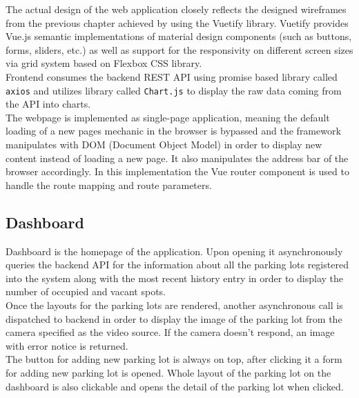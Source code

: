 \documentclass[thesis=M,english]{FITthesis}[2019/03/06]
\begin{document}
The actual design of the web application closely reflects the designed wireframes from the previous chapter achieved by using the Vuetify library. Vuetify provides Vue.js semantic implementations of material design components (such as buttons, forms, sliders, etc.) as well as support for the responsivity on different screen sizes via grid system based on Flexbox CSS library.\\

Frontend consumes the backend REST API using promise based library called \texttt{axios} and utilizes library called \texttt{Chart.js} to display the raw data coming from the API into charts.\\

The webpage is implemented as single-page application, meaning the default loading of a new pages mechanic in the browser is bypassed and the framework manipulates with DOM (Document Object Model) in order to display new content instead of loading a new page. It also manipulates the address bar of the browser accordingly. In this implementation the Vue router component is used to handle the route mapping and route parameters.

\subsection{Dashboard}
Dashboard is the homepage of the application. Upon opening it asynchronously queries the backend API for the information about all the parking lots registered into the system along with the most recent history entry in order to display the number of occupied and vacant spots.\\

Once the layouts for the parking lots are rendered, another asynchronous call is dispatched to backend in order to display the image of the parking lot from the camera specified as the video source. If the camera doesn't respond, an image with error notice is returned.\\

The button for adding new parking lot is always on top, after clicking it a form for adding new parking lot is opened. Whole layout of the parking lot on the dashboard is also clickable and opens the detail of the parking lot when clicked.\\
\end{document}
